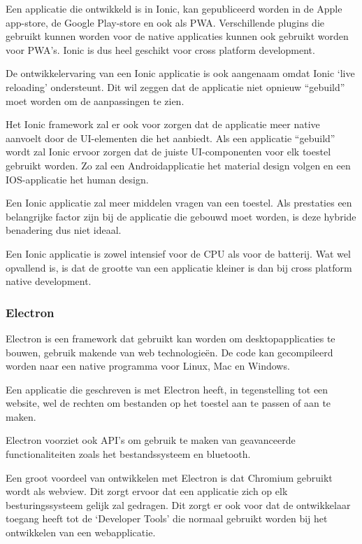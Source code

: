 		Een applicatie die ontwikkeld is in Ionic, kan gepubliceerd worden in de Apple app-store, de Google Play-store en ook als PWA. Verschillende plugins die gebruikt kunnen worden voor de native applicaties kunnen ook gebruikt worden voor PWA’s. Ionic is dus heel geschikt voor cross platform development. 
		
		\autocite{Ionic2020a}
		
		De ontwikkelervaring van een Ionic applicatie is ook aangenaam omdat Ionic ‘live reloading’ ondersteunt. Dit wil zeggen dat de applicatie niet opnieuw “gebuild” moet worden om de aanpassingen te zien. 
		
		\autocite{Lucas2020}
		
		Het Ionic framework zal er ook voor zorgen dat de applicatie meer native aanvoelt door de UI-elementen die het aanbiedt. Als een applicatie “gebuild” wordt zal Ionic ervoor zorgen dat de juiste UI-componenten voor elk toestel gebruikt worden. Zo zal een Androidapplicatie het material design volgen en een IOS-applicatie het human design. 
		
		Een Ionic applicatie zal meer middelen vragen van een toestel. Als prestaties een belangrijke factor zijn bij de applicatie die gebouwd moet worden, is deze hybride benadering dus niet ideaal.
		
		Een Ionic applicatie is zowel intensief voor de CPU als voor de batterij. Wat wel opvallend is, is dat de grootte van een applicatie kleiner is dan bij cross platform native development. 
		
		\autocite{Asp2017}	


	\subsubsection{Electron}
		Electron is een framework dat gebruikt kan worden om desktopapplicaties te bouwen, gebruik makende van web technologieën.  De code kan gecompileerd worden naar een native programma voor Linux, Mac en Windows.
		
		Een applicatie die geschreven is met Electron heeft, in tegenstelling tot een website, wel de rechten om bestanden op het toestel aan te passen of aan te maken.
		
		Electron voorziet ook API’s om gebruik te maken van geavanceerde functionaliteiten zoals het bestandssysteem en bluetooth.
		
		Een groot voordeel van ontwikkelen met Electron is dat Chromium gebruikt wordt als webview. Dit zorgt ervoor dat een applicatie zich op elk besturingssysteem gelijk zal gedragen. Dit zorgt er ook voor dat de ontwikkelaar toegang heeft tot de ‘Developer Tools’ die normaal gebruikt worden bij het ontwikkelen van een webapplicatie. 
		
